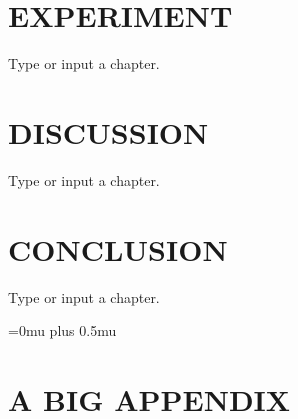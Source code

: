 \documentclass[dissertation]{uathesis_me}
\begin{document}
\begin{body}
\chapter{EXPERIMENT}
Type or input{} a chapter. \cite{rocket-themoon2167}

\chapter{DISCUSSION}
Type or input{} a chapter. \cite{rocket-themoon2167}

\chapter{CONCLUSION}
Type or input{} a chapter. \cite{rocket-themoon2167}



\linespread{1}\selectfont %

\Urlmuskip=0mu plus 0.5mu\relax
\sloppy


\renewcommand{\bibsection}{\topskip=1in\chapter*{REFERENCES}\topskip=0in \addcontentsline{toc}{chapter}{REFERENCES}}



\setlength{\bibsep}{0pt plus 0.3ex}

\appendix

\chapter{A BIG APPENDIX}



\end{body}
\end{document}
